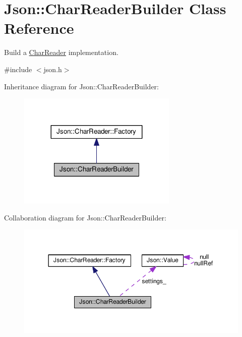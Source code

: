 \hypertarget{class_json_1_1_char_reader_builder}{}\section{Json\+:\+:Char\+Reader\+Builder Class Reference}
\label{class_json_1_1_char_reader_builder}


Build a \hyperlink{class_json_1_1_char_reader}{Char\+Reader} implementation.  




{\ttfamily \#include $<$json.\+h$>$}



Inheritance diagram for Json\+:\+:Char\+Reader\+Builder\+:
\nopagebreak
\begin{figure}[H]
\begin{center}
\leavevmode
\includegraphics[width=215pt]{class_json_1_1_char_reader_builder__inherit__graph}
\end{center}
\end{figure}


Collaboration diagram for Json\+:\+:Char\+Reader\+Builder\+:
\nopagebreak
\begin{figure}[H]
\begin{center}
\leavevmode
\includegraphics[width=350pt]{class_json_1_1_char_reader_builder__coll__graph}
\end{center}
\end{figure}
